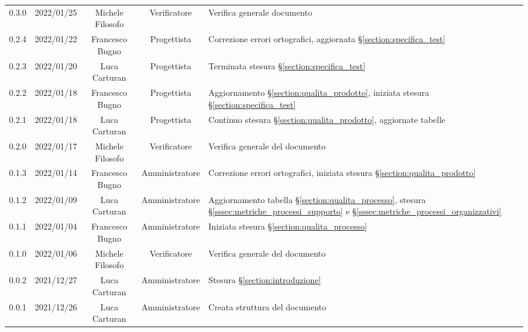\begin{center}
\begin{longtable}[c]{c | c | c | c | p{5cm}}
		0.3.0 & 2022/01/25 & Michele Filosofo & Verificatore & Verifica generale documento\\
		0.2.4 & 2022/01/22 & Francesco Bugno & Progettista & Correzione errori ortografici, aggiornata §\ref{section:specifica_test}\\
		0.2.3 & 2022/01/20 & Luca Carturan & Progettista & Terminata stesura §\ref{section:specifica_test}\\
		0.2.2 & 2022/01/18 & Francesco Bugno & Progettista & Aggiornamento §\ref{section:qualita_prodotto}, iniziata stesura §\ref{section:specifica_test}\\
		0.2.1 & 2022/01/18 & Luca Carturan & Progettista & Continuo stesura §\ref{section:qualita_prodotto}, aggiornate tabelle\\
		0.2.0 & 2022/01/17 & Michele Filosofo & Verificatore & Verifica generale del documento\\
		0.1.3 & 2022/01/14 & Francesco Bugno & Amministratore & Correzione errori ortografici, iniziata stesura §\ref{section:qualita_prodotto}\\
		0.1.2 & 2022/01/09 & Luca Carturan & Amministratore & Aggiornamento tabella §\ref{section:qualita_processo}, stesura §\ref{sssec:metriche_processi_supporto} e §\ref{sssec:metriche_processi_organizzativi}\\
		0.1.1 & 2022/01/04 & Francesco Bugno & Amministratore & Iniziata stesura §\ref{section:qualita_processo}\\
		0.1.0 & 2022/01/06 & Michele Filosofo & Verificatore & Verifica generale del documento \\
		0.0.2 & 2021/12/27 & Luca Carturan & Amministratore & Stesura §\ref{section:introduzione}\\
		0.0.1 & 2021/12/26 & Luca Carturan & Amministratore & Creata struttura del documento
	\end{longtable}
\end{center}